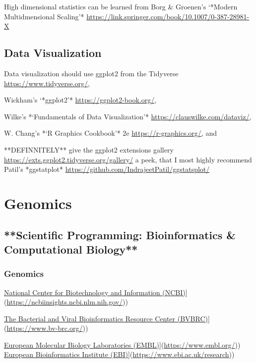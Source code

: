 \documentclass[
]{book}
\begin{document}
High dimensional statistics can be learned from Borg \& Groenen's `*Modern Multidmensional Scaling'* \url{https://link.springer.com/book/10.1007/0-387-28981-X}

\section{Data Visualization}\label{data-visualization}

Data visualization should use ggplot2 from the Tidyverse \url{https://www.tidyverse.org/},

Wickham's `*ggplot2'* \url{https://ggplot2-book.org/},

Wilke's *`Fundamentals of Data Visualization'* \url{https://clauswilke.com/dataviz/},

W. Chang's *`R Graphics Cookbook'* 2e \url{https://r-graphics.org/}, and

**DEFINNITELY** give the ggplot2 extensions gallery \url{https://exts.ggplot2.tidyverse.org/gallery/} a peek, that I most highly recommend Patil's *ggstatplot* \url{https://github.com/IndrajeetPatil/ggstatsplot/}

\chapter{Genomics}\label{genomics}

\section{**Scientific Programming: Bioinformatics \& Computational Biology**}\label{scientific-programming-bioinformatics-computational-biology}

\subsection{Genomics}\label{genomics-1}

\href{\%5Bhttps://ncbiinsights.ncbi.nlm.nih.gov/}{National Center for Biotechnology and Information (NCBI)}{]}(\url{https://ncbiinsights.ncbi.nlm.nih.gov/}))

\href{\%5Bhttps://www.bv-brc.org/}{The Bacterial and Viral Bioinformatics Resource Center (BVBRC)}{]}(\url{https://www.bv-brc.org/}))

\href{\%5Bhttps://www.embl.org/}{European Molecular Biology Laboratories (EMBL)}{]}(\url{https://www.embl.org/})) \href{\%5Bhttps://www.ebi.ac.uk/research}{European Bioinformatics Institute (EBI)}{]}(\url{https://www.ebi.ac.uk/research}))
\end{document}
